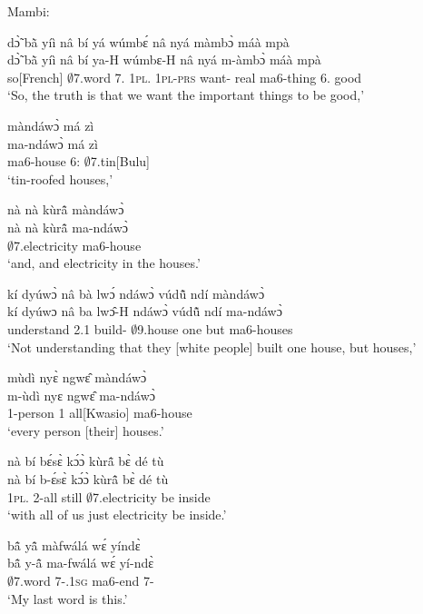\noindent Mambi:

\begin{exe}[(C234)] 
\exC\label{186}
  \glll dɔ̃̀ bã̀ yíì nâ bí yá wúmbɛ́ nâ nyá màmbɔ̀ máà mpà \\
      dɔ̃̀ bã̀ yíì nâ bí ya-H wúmbɛ-H nâ nyá m-àmbɔ̀ máà mpà \\
        so[French] $\emptyset$7.word 7.{\COP} {\COMP} 1\textsc{pl}.{\PN}  1\textsc{pl}-\textsc{prs} want-{\R} {\COMP} real ma6-thing 6.{\COP} good  \\
    \trans `So, the truth is that we want the important things to be good,'
 
\exC\label{187}
  \glll màndáwɔ̀ má zì \\
       ma-ndáwɔ̀ má zì \\
        ma6-house 6:{\ATT}  $\emptyset$7.tin[Bulu]  \\
    \trans `tin-roofed houses,'
 
\exC\label{188}
  \glll nà nà kùrã̂ màndáwɔ̀ \\
       nà nà kùrã̂ ma-ndáwɔ̀ \\
        {\CONJ} {\CONJ} $\emptyset$7.electricity ma6-house  \\
    \trans `and, and electricity in the houses.'
 
\exC\label{189}
  \glll kí dyúwɔ̀ nâ bà lwɔ́ ndáwɔ̀ vúdũ̂ ndí màndáwɔ̀ \\
        kí dyúwɔ nâ ba lwɔ̂-H ndáwɔ̀ vúdũ̂ ndí ma-ndáwɔ̀ \\
         {\NEG} understand {\COMP} 2.{\PST}1 build-{\R} $\emptyset$9.house one but ma6-houses \\
    \trans `Not understanding that they [white people] built one house, but houses,'
 
\exC\label{190} 
  \glll mùdì nyɛ̀ ngwɛ̂ màndáwɔ̀ \\
         m-ùdì nyɛ ngwɛ̂ ma-ndáwɔ̀ \\
         {\N}1-person 1 all[Kwasio] ma6-house \\
    \trans `every person [their] houses.'
 
\exC\label{191}
  \glll nà bí bɛ́sɛ̀ kɔ́ɔ̀ kùrã̂  bɛ̀ dé tù \\
       nà bí b-ɛ́sɛ̀ kɔ́ɔ̀ kùrã̂  bɛ̀ dé tù \\
        {\COM} 1\textsc{pl}.{\SBJ}  2-all still $\emptyset$7.electricity  be {\LOC} inside \\
    \trans `with all of us just electricity be inside.'
 
\exC\label{192}
  \glll bã̂ yã̂ màfwálá wɛ́ yíndɛ̀ \\
        bã̂ y-ã̂ ma-fwálá wɛ́ yí-ndɛ̀ \\
         $\emptyset$7.word 7-{\POSS}.1\textsc{sg} ma6-end {\ID} 7-{\ANA} \\
    \trans `My last word is this.'
\end{exe}

